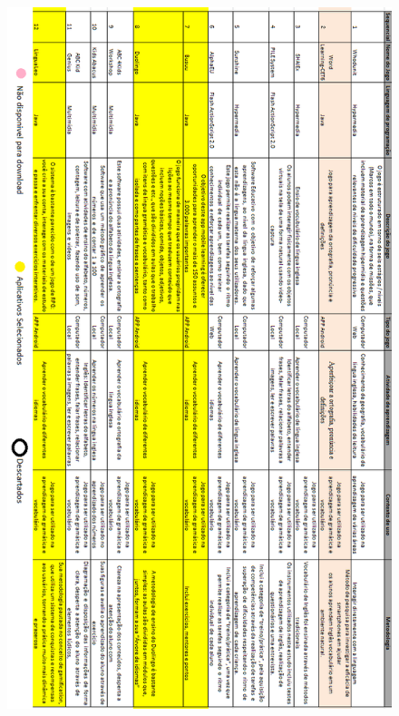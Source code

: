 \documentclass[
	12pt,				%
	openany,			%
	oneside,			%
	a4paper,			%
	english,			%
	french,				%
	spanish,			%
	brazil				%
	]{abntex2}
\begin{document}
\begin{apendicesenv}
\begin{figure}[H]
\includegraphics[width=12cm]{figuras/tabela.png}
\par

\end{figure}


\end{apendicesenv}








\printindex
\end{document}
